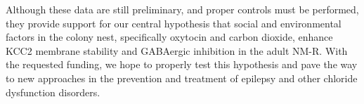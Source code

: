 \documentclass[11pt]{nih}
\begin{document}
\par Although these data are still preliminary, and proper controls must be performed, they provide support for our central hypothesis that social and environmental factors in the colony nest, specifically oxytocin and carbon dioxide, enhance KCC2 membrane stability and GABAergic inhibition in the adult NM-R.  With the requested funding, we hope to properly test this hypothesis and pave the way to new approaches in the prevention and treatment of epilepsy and other chloride dysfunction disorders.


\newpage

\end{document}
